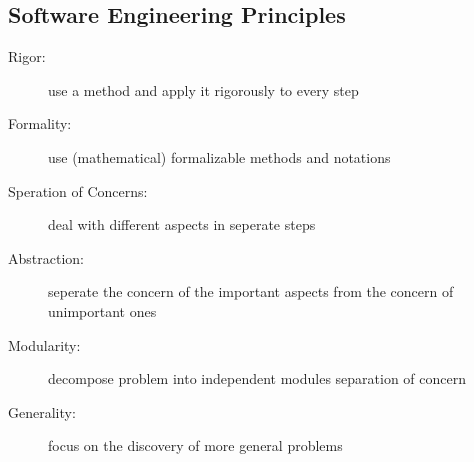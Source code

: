 \documentclass[a4paper, 10pt]{article}
\begin{document}
\subsection*{Software Engineering Principles}
\begin{description}
	\item[Rigor:] use a method and apply it rigorously to every step
	\item[Formality:] use (mathematical) formalizable methods and notations
	\item[Speration of Concerns:] deal with different aspects in seperate steps
	\item[Abstraction:] seperate the concern of the important aspects from the concern of unimportant ones
	\item[Modularity:] decompose problem into independent modules \follows separation of concern
	\item[Generality:] focus on the discovery of more general problems
\end{description}
\end{document}
